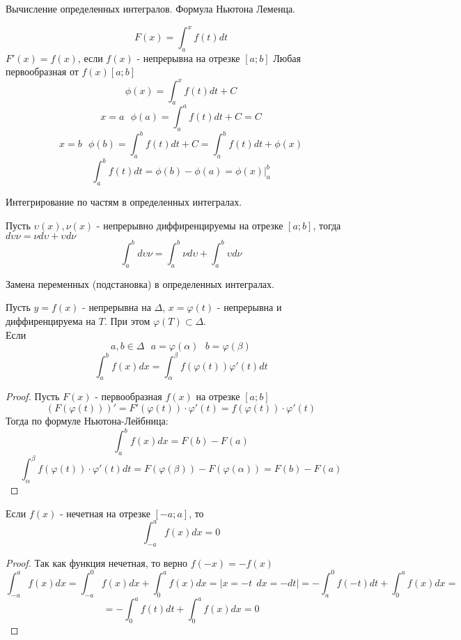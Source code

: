 \begin{title}[\Large]
  Вычисление определенных интегралов. Формула Ньютона Леменца.
\end{title}

\[F(x) = \int^x_a f(t)dt\]
$F'(x) = f(x)$, если $f(x)$ - непрерывна на отрезке $[a; b]$ Любая первообразная
от $f(x) [a; b]$
\[\phi (x) = \int^x_a f(t)dt + C\]
\[x = a ~~~ \phi (a) = \int^a_a f(t)dt + C = C\]
\[x = b ~~~ \phi (b) = \int^b_a f(t)dt + C = \int^b_a f(t)dt + \phi(x)\]
\[\int^b_a f(t)dt = \phi(b) - \phi(a) = \phi(x)|^b_a\]

\begin{title}[\Large]
  Интегрирование по частям в определенных интегралах.
\end{title}

\begin{theorem}
  Пусть $\upsilon (x), \nu(x)$ - непрерывно диффиренцируемы на отрезке $[a; b]$,
  тогда $d\upsilon \nu = \nu d \upsilon + \upsilon d \nu$
  \[\int^b_a d\upsilon \nu = \int^b_a \nu d \upsilon +
    \int ^b_a \upsilon d \nu\]
\end{theorem}

\begin{title}[\Large]
  Замена переменных (подстановка) в определенных интегралах.
\end{title}

\begin{theorem}
  Пусть $y = f(x)$ - непрерывна на $\Delta$, $x = \varphi (t)$ - непрерывна и
  диффиренцируема на $T$. При этом $\varphi (T) \subset \Delta$.\\
  Если
  \[a, b \in \Delta ~~~ a = \varphi (\alpha) ~~~ b = \varphi (\beta)\]
  \[\int^b_a f(x)dx = \int^{\beta}_{\alpha} f(\varphi (t)) \varphi' (t)dt\]
\end{theorem}

\begin{proof}
  Пусть $F(x)$ - первообразная $f(x)$ на отрезке $[a; b]$\\
  \[
    (F(\varphi (t)))' = F'(\varphi (t)) \cdot \varphi' (t) = f(\varphi(t))
    \cdot \varphi'(t)
  \]
  Тогда по формуле Ньютона-Лейбница:
  \[\int^b_a f(x)dx = F(b) - F(a)\]
  \[
    \int^{\beta}_{\alpha} f(\varphi (t)) \cdot \varphi' (t)dt =
    F(\varphi (\beta)) - F(\varphi (\alpha)) = F(b) - F(a)
  \]
\end{proof}

\begin{theorem}
  Если $f(x)$ - нечетная на отрезке $[-a; a]$, то
  \[\int^a_{-a} f(x)dx = 0\]
\end{theorem}

\begin{proof}
  Так как функция нечетная, то верно $f(-x) = -f(x)$
  \[\int^a_{-a} f(x)dx = \int^0_{-a} f(x)dx + \int^a_0 f(x)dx =
    |x = -t ~~ dx = -dt| = -\int^0_a f(-t)dt + \int^a_0 f(x)dx =\]
    \[= -\int^a_0 f(t)dt + \int^a_0 f(x)dx = 0\]
\end{proof}